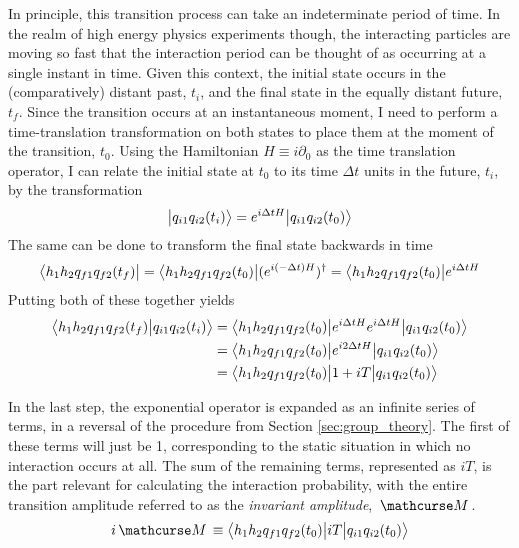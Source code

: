     In principle, this transition process can take an indeterminate period of time.
    In the realm of high energy physics experiments though,
        the interacting particles are moving so fast that the interaction period can be thought of as occurring at a single instant in time.
    Given this context, the initial state occurs in the (comparatively) distant past, $t_i$, and the final state in the equally distant future, $t_f$.
    Since the transition occurs at an instantaneous moment,
        I need to perform a time-translation transformation on both states to place them at the moment of the transition, $t_0$.
    Using the Hamiltonian $H \equiv i\partial_0$ as the time translation operator,
        I can relate the initial state at $t_0$ to its time $\Delta t$ units in the future, $t_i$, by the transformation
    \begin{equation}
        \big| q_{i1} q_{i2} (t_i) \big> = e^{i\Delta tH}\big| q_{i1} q_{i2} (t_0) \big>
    \end{equation}
    The same can be done to transform the final state backwards in time
    \begin{equation}
        \big< h_1 h_2 q_{f1} q_{f2} (t_f) \big|
        = \big< h_1 h_2 q_{f1} q_{f2} (t_0) \big| (e^{i(-\Delta t)H})^\dag
        = \big< h_1 h_2 q_{f1} q_{f2} (t_0) \big| e^{i\Delta tH}
    \end{equation}
    Putting both of these together yields
    \begin{equation} \begin{split} \label{eq:transition_amplitude}
        \big<  h_1 h_2 q_{f1} q_{f2} (t_f) \big| q_{i1} q_{i2} (t_i) \big>
        &= \big<  h_1 h_2 q_{f1} q_{f2} (t_0) \big| e^{i\Delta tH} e^{i\Delta tH} \big| q_{i1} q_{i2} (t_0) \big>
        \\&= \big<  h_1 h_2 q_{f1} q_{f2} (t_0) \big| e^{i2\Delta tH} \big| q_{i1} q_{i2} (t_0) \big>
        \\&= \big<  h_1 h_2 q_{f1} q_{f2} (t_0) \big| 1 + iT \big| q_{i1} q_{i2} (t_0) \big>
    \end{split} \end{equation}

    In the last step, the exponential operator is expanded as an infinite series of terms,
        in a reversal of the procedure from Section \ref{sec:group_theory}.
    The first of these terms will just be 1, corresponding to the static situation in which no interaction occurs at all.
    The sum of the remaining terms, represented as $iT$, is the part relevant for calculating the interaction probability,
        with the entire transition amplitude referred to as the \textit{invariant amplitude}, $\invAmp$.
    \begin{equation}
        i\invAmp \equiv \TbraketA{ h_1 h_2 q_{f1} q_{f2} (t_0)}{iT}{q_{i1} q_{i2} (t_0)}
    \end{equation}

